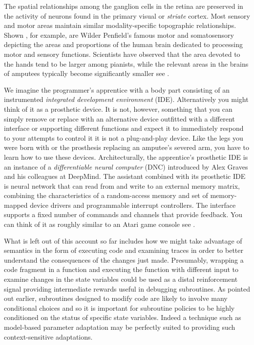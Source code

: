 The spatial relationships among the ganglion cells in the retina are preserved in the activity of neurons found in the primary visual \emdash{} or {\it{striate}} \emdash{} cortex. Most sensory and motor areas maintain similar modality-specific topographic relationships. Shown {{}}, for example, are Wilder Penfield's famous motor and somatosensory {} depicting the areas and proportions of the human brain dedicated to processing motor and sensory functions. Scientists have observed that the area devoted to the hands tend to be larger among pianists, while the relevant areas in the brains of amputees typically become significantly smaller \emdash{} see {{}}.

We imagine the programmer's apprentice with a body part consisting of an instrumented {\it{integrated development environment}} (IDE). Alternatively you might think of it as a prosthetic device. It is not, however, something that you can simply remove or replace with an alternative device outfitted with a different interface or supporting different functions and expect it to immediately respond to your attempts to control it \emdash{} it is not a plug-and-play device. Like the legs you were born with or the prosthesis replacing an amputee's severed arm, you have to learn how to use these devices. Architecturally, the apprentice's prosthetic IDE is an instance of a {\it{differentiable neural computer}} (DNC) introduced by Alex Graves and his colleagues at DeepMind. The assistant combined with its prosthetic IDE is neural network that can read from and write to an external memory matrix, combining the characteristics of a random-access memory and set of memory-mapped device drivers and programmable interrupt controllers. The interface supports a fixed number of commands and channels that provide feedback. You can think of it as roughly similar to an Atari game console \emdash{} see {{}}.

What is left out of this account so far includes how we might take advantage of semantics in the form of executing code and examining traces in order to better understand the consequences of the changes just made. Presumably, wrapping a code fragment in a function and executing the function with different input to examine changes in the state variables could be used as a distal reinforcement signal providing intermediate rewards useful in debugging subroutines. As pointed out earlier, subroutines designed to modify code are likely to involve many conditional choices and so it is important for subroutine policies to be highly conditioned on the status of specific state variables. Indeed a technique such as model-based parameter adaptation may be perfectly suited to providing such context-sensitive adaptations.

